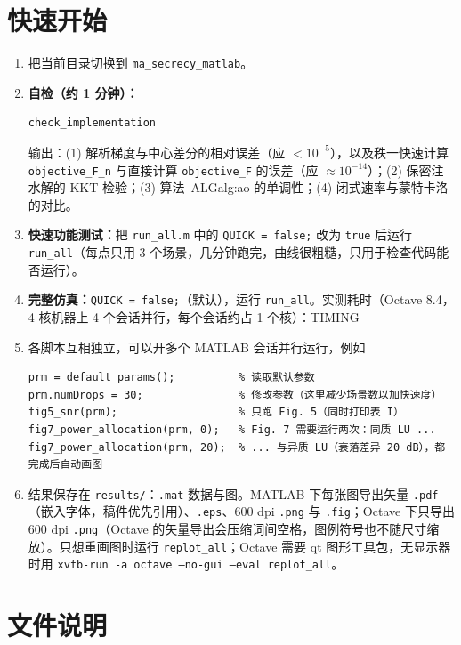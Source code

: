\documentclass[11pt,a4paper]{ctexart}
\newcommand{\code}[1]{\texttt{#1}}
\begin{document}
\section{快速开始}
\begin{enumerate}
\item 把当前目录切换到 \code{ma\_secrecy\_matlab}。
\item \textbf{自检（约 1 分钟）：}
\begin{lstlisting}
check_implementation
\end{lstlisting}
输出：(1) 解析梯度与中心差分的相对误差（应 $<10^{-5}$），以及秩一快速计算 \code{objective\_F\_n} 与直接计算 \code{objective\_F} 的误差（应 $\approx10^{-14}$）；(2) 保密注水解的 KKT 检验；(3) 算法~ALG{alg:ao} 的单调性；(4) 闭式速率与蒙特卡洛的对比。
\item \textbf{快速功能测试：}把 \code{run\_all.m} 中的 \code{QUICK = false;} 改为 \code{true} 后运行 \code{run\_all}（每点只用 3 个场景，几分钟跑完，曲线很粗糙，只用于检查代码能否运行）。
\item \textbf{完整仿真：}\code{QUICK = false;}（默认），运行 \code{run\_all}。实测耗时（Octave 8.4，4 核机器上 4 个会话并行，每个会话约占 1 个核）：TIMING
\item 各脚本互相独立，可以开多个 MATLAB 会话并行运行，例如
\begin{lstlisting}
prm = default_params();          % 读取默认参数
prm.numDrops = 30;               % 修改参数（这里减少场景数以加快速度）
fig5_snr(prm);                   % 只跑 Fig. 5（同时打印表 I）
fig7_power_allocation(prm, 0);   % Fig. 7 需要运行两次：同质 LU ...
fig7_power_allocation(prm, 20);  % ... 与异质 LU（衰落差异 20 dB），都完成后自动画图
\end{lstlisting}
\item 结果保存在 \code{results/}：\code{.mat} 数据与图。MATLAB 下每张图导出矢量 \code{.pdf}（嵌入字体，稿件优先引用）、\code{.eps}、600 dpi \code{.png} 与 \code{.fig}；Octave 下只导出 600 dpi \code{.png}（Octave 的矢量导出会压缩词间空格，图例符号也不随尺寸缩放）。只想重画图时运行 \code{replot\_all}；Octave 需要 qt 图形工具包，无显示器时用 \code{xvfb-run -a octave --no-gui --eval replot\_all}。
\end{enumerate}

\section{文件说明}
\end{document}
